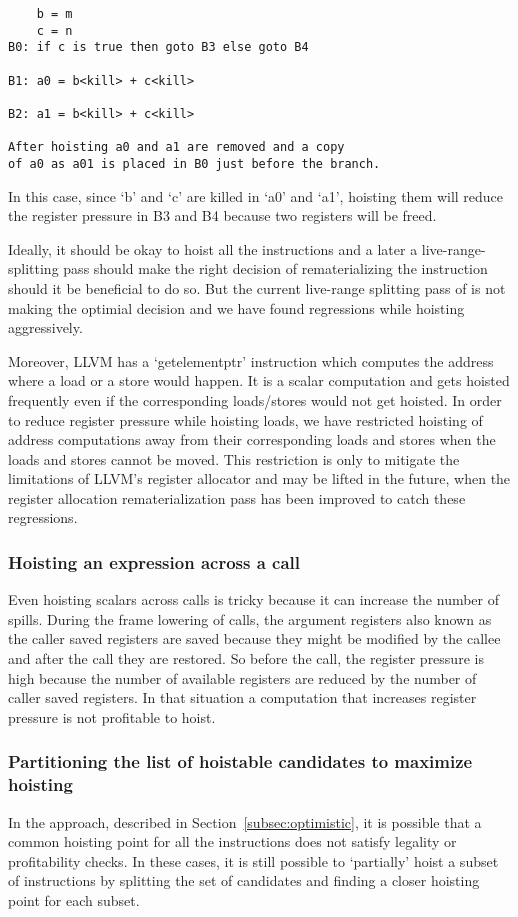 \documentclass[acmlarge,review]{acmart}\settopmatter{printfolios=true}
\begin{document}
\begin{verbatim}
    b = m
    c = n
B0: if c is true then goto B3 else goto B4

B1: a0 = b<kill> + c<kill>

B2: a1 = b<kill> + c<kill>

After hoisting a0 and a1 are removed and a copy
of a0 as a01 is placed in B0 just before the branch.
\end{verbatim}

In this case, since `b' and `c' are killed in `a0' and `a1', hoisting them will
reduce the register pressure in B3 and B4 because two registers will be freed.

Ideally, it should be okay to hoist all the instructions and a later a
live-range-splitting \cite{cooper1998live} pass should make the right decision
of rematerializing the instruction should it be beneficial to do so. But the
current live-range splitting pass of \LLVM{} is not making the optimial decision
and we have found regressions while hoisting aggressively.

Moreover, LLVM has a `getelementptr' instruction which computes the address
where a load or a store would happen. It is a scalar computation and gets
hoisted frequently even if the corresponding loads/stores would not get hoisted.
In order to reduce register pressure while hoisting loads, we have restricted
hoisting of address computations away from their corresponding loads and stores
when the loads and stores cannot be moved.  This restriction is only to mitigate
the limitations of LLVM's register allocator and may be lifted in the future,
when the register allocation rematerialization pass has been improved to catch
these regressions.

\subsubsection{Hoisting an expression across a call}
\label{cost:across-calls}
Even hoisting scalars across calls is tricky because it can increase the number
of spills. During the frame lowering of calls, the argument registers also known
as the caller saved registers are saved because they might be modified by the
callee and after the call they are restored. So before the call, the register
pressure is high because the number of available registers are reduced by the
number of caller saved registers. In that situation a computation that increases
register pressure is not profitable to hoist.

\subsubsection{Partitioning the list of hoistable candidates to maximize hoisting}
\label{subsec:partition}
In the approach, described in Section~\ref{subsec:optimistic}, it is possible
that a common hoisting point for all the instructions does not satisfy legality
or profitability checks. In these cases, it is still possible to `partially'
hoist a subset of instructions by splitting the set of candidates and finding a
closer hoisting point for each subset.
\end{document}
